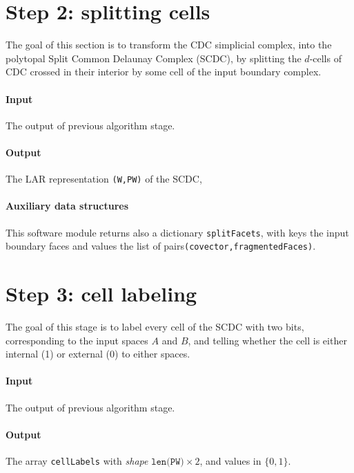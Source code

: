 \documentclass[11pt,oneside]{article}	%
\begin{document}
\section{Step 2: splitting cells}

The goal of this section is to transform the CDC simplicial complex, into the polytopal Split Common Delaunay Complex (SCDC), by splitting the $d$-cells of CDC crossed in their interior by some cell of the input boundary complex.

\paragraph{Input}
The output of previous algorithm stage.

\paragraph{Output}
The LAR representation \texttt{(W,PW)} of the SCDC,

\paragraph{Auxiliary data structures} 
This software module returns also
 a dictionary \texttt{splitFacets}, with keys the  input boundary faces and values the list of pairs\texttt{(covector,fragmentedFaces)}.   



\section{Step 3: cell labeling}

The goal of this stage is to label every cell of the SCDC with two bits, corresponding to the input spaces $A$ and $B$, and telling whether the cell is either internal (1) or external (0) to either spaces.

\paragraph{Input}
The output of previous algorithm stage.

\paragraph{Output}
The array \texttt{cellLabels} with \emph{shape} $\texttt{len(PW)}\times 2$, and values in $\{0,1\}$.
\end{document}
